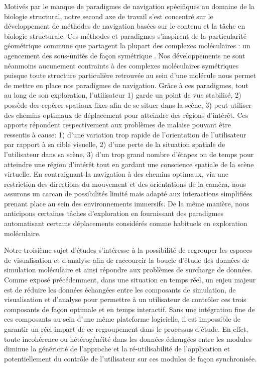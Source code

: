 Motivés par le manque de paradigmes de navigation spécifiques au domaine de la biologie structural, notre second axe de travail s'est concentré sur le développement de méthodes de navigation basées sur le contenu et la tâche en biologie structurale. Ces méthodes et paradigmes s'inspirent de la particularité géométrique commune que partagent la plupart des complexes moléculaires : un agencement des sous-unités de façon symétrique \cite{goodsell_structural_2000}. Nos développements ne sont néanmoins aucunement contraints à des complexes moléculaires symétriques puisque toute structure particulière retrouvée au sein d'une molécule nous permet de mettre en place nos paradigmes de navigation. Grâce à ces paradigmes, tout au long de son exploration, l'utilisateur 1) garde un point de vue stabilisé, 2) possède des repères spatiaux fixes afin de se situer dans la scène, 3) peut utiliser des chemins optimaux de déplacement pour atteindre des régions d’intérêt. Ces apports répondent respectivement aux problèmes de malaise pouvant être ressentis à cause: 1) d'une variation trop rapide de l'orientation de l'utilisateur par rapport à sa cible visuelle, 2) d'une perte de la situation spatiale de l'utilisateur dans sa scène, 3) d'un trop grand nombre d'étapes ou de temps pour atteindre une région d'intérêt tout en gardant une conscience spatiale de la scène virtuelle. En contraignant la navigation à des chemins optimaux, via une restriction des directions du mouvement et des orientations de la caméra, nous assurons un carcan de possibilités limité mais adapté aux interactions simplifiées prenant place au sein des environnements immersifs. De la même manière, nous anticipons certaines tâches d'exploration en fournissant des paradigmes automatisant certains déplacements considérés comme habituels en exploration moléculaire.

Notre troisième sujet d'études s'intéresse à la possibilité de regrouper les espaces de visualisation et d'analyse afin de raccourcir la boucle d'étude des données de simulation moléculaire et ainsi répondre aux problèmes de surcharge de données. Comme exposé précédemment, dans une situation en temps réel, un enjeu majeur est de réduire les données échangées entre les composants de simulation, de visualisation et d'analyse pour permettre à un utilisateur de contrôler ces trois composants de façon optimale et en temps interactif. Sans une intégration fine de ces composants au sein d'une même plateforme logicielle, il est impossible de garantir un réel impact de ce regroupement dans le processus d'étude. En effet, toute incohérence ou hétérogénéité dans les données échangées entre les modules diminue la généricité de l'approche et la ré-utilisabilité de l'application et potentiellement du contrôle de l'utilisateur sur ces modules de façon synchronisée. 

